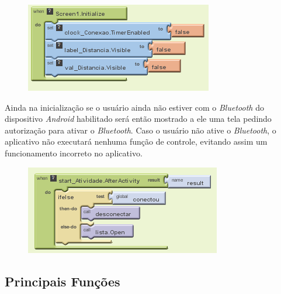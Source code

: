 \documentclass[portugues, brazil, a4paper,12pt]{article}
\begin{document}
\begin{figure}[H]
	\centering
	\includegraphics[scale=.8]{img/controle/screenInitialize.png}
	
\end{figure}

Ainda na inicialização se o usuário ainda não estiver com o \textit{Bluetooth} do dispositivo \textit{Android} habilitado será então mostrado a ele uma tela pedindo autorização para ativar o \textit{Bluetooth}. Caso o usuário não ative o \textit{Bluetooth}, o aplicativo não executará nenhuma função de controle, evitando assim um funcionamento incorreto no aplicativo.



\begin{figure}[H]
	\centering
	\includegraphics[scale=.8]{img/controle/screenInitialize1.png}
	
\end{figure}








\subsection{Principais Funções}
\end{document}

